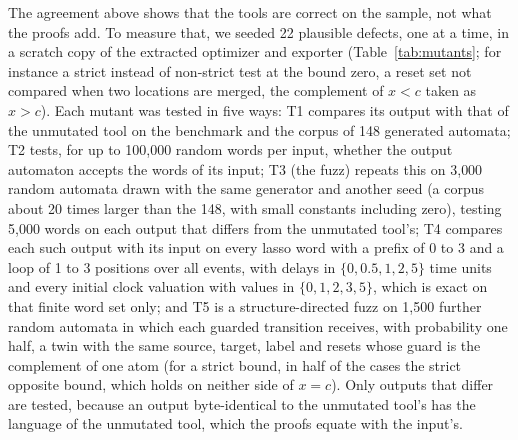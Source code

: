 The agreement above shows that the tools are correct on the sample, not what the proofs add. To measure that, we seeded 22 plausible defects, one at a time, in a scratch copy of the extracted optimizer and exporter (Table~\ref{tab:mutants}; for instance a strict instead of non-strict test at the bound zero, a reset set not compared when two locations are merged, the complement of $x<c$ taken as $x>c$). Each mutant was tested in five ways: T1 compares its output with that of the unmutated tool on the benchmark and the corpus of 148 generated automata; T2 tests, for up to 100{,}000 random words per input, whether the output automaton accepts the words of its input; T3 (the fuzz) repeats this on 3{,}000 random automata drawn with the same generator and another seed (a corpus about 20 times larger than the 148, with small constants including zero), testing 5{,}000 words on each output that differs from the unmutated tool's; T4 compares each such output with its input on every lasso word with a prefix of 0 to 3 and a loop of 1 to 3 positions over all events, with delays in $\{0,0.5,1,2,5\}$ time units and every initial clock valuation with values in $\{0,1,2,3,5\}$, which is exact on that finite word set only; and T5 is a structure-directed fuzz on 1{,}500 further random automata in which each guarded transition receives, with probability one half, a twin with the same source, target, label and resets whose guard is the complement of one atom (for a strict bound, in half of the cases the strict opposite bound, which holds on neither side of $x=c$). Only outputs that differ are tested, because an output byte-identical to the unmutated tool's has the language of the unmutated tool, which the proofs equate with the input's.

